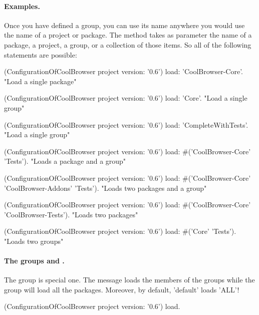 \documentclass[a4paper,10pt,twoside]{book}
\begin{document}
 
 

\paragraph{Examples.} Once you have defined a group, you can use its name anywhere you would use the name of a project or package. The   method takes as parameter the name of a package, a project, a group, or a collection of those items.  So all of the following statements are possible:

 
\begin{code}{}
(ConfigurationOfCoolBrowser project version: '0.6') load: 'CoolBrowser-Core'. 
       "Load a single package"

(ConfigurationOfCoolBrowser project version: '0.6') load: 'Core'. 
       "Load a single group"

(ConfigurationOfCoolBrowser project version: '0.6') load: 'CompleteWithTests'.  
       "Load a single group"
 
(ConfigurationOfCoolBrowser project version: '0.6') 
       load: #('CoolBrowser-Core' 'Tests').    
       "Loads a package and a group"

(ConfigurationOfCoolBrowser project version: '0.6') 
       load: #('CoolBrowser-Core' 'CoolBrowser-Addons' 'Tests'). 
       "Loads two packages and a group" 

(ConfigurationOfCoolBrowser project version: '0.6') 
       load: #('CoolBrowser-Core' 'CoolBrowser-Tests').
       "Loads two packages"
  
(ConfigurationOfCoolBrowser project version: '0.6') load: #('Core' 'Tests'). 
       "Loads two groups"
\end{code}


\paragraph{The groups  and .} 
The  group is special one.  The  message loads the members of the  groups while the group  
will load all the packages. Moreover, by default, 'default' loads 'ALL'!

    
\begin{code}{}
(ConfigurationOfCoolBrowser project version: '0.6') load.
\end{code}
\end{document}
